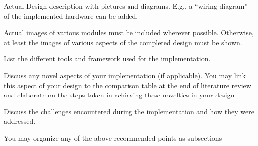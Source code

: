 \documentclass[../main.tex]{subfiles}
\begin{document}
\begin{newrequirements}
    \begin{todolist}
    \item Actual Design description with pictures 
        and diagrams. E.g., a “wiring diagram” 
        of the implemented hardware can be 
        added. 

    \item Actual images of various modules must 
        be included wherever possible. 
        Otherwise, at least the images of 
        various aspects of the completed design 
        must be shown. 

    \item List the different tools and framework 
        used for the implementation. 

    \item Discuss any novel aspects of your 
        implementation (if applicable). You may 
        link this aspect of your design to the 
        comparison table at the end of 
        literature review and elaborate on the 
        steps taken in achieving these 
        novelties in your design. 

    \item Discuss the challenges encountered 
        during the implementation and how they 
        were addressed. 

    \item You may organize any of the above 
        recommended points as subsections 

    \end{todolist}
\end{newrequirements}

\lipsum[1]
\end{document}
